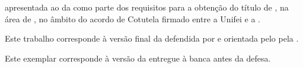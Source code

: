 \makeatletter
  \begin{center}
    \large\bfseries
    \@UNIFEI \\
    \@UNIDADEENSINO
  \end{center}
  \vfill
  \begin{center}
    \large\bfseries
    \if\@autora\relax\@autor\else\@autora\fi
  \vfill
    \@titulo
    \ifx\@subtitulo\relax\else
      \\[0.2cm]
      \normalfont
      \@subtitulo
    \fi
  \end{center}
  \vfill
  \normalfont\normalsize
  \hfill
  \begin{minipage}[t]{0.54\textwidth}
    \suppresshyphens
    \@monopt\xspace apresentada ao \@UNIDADEENSINO{} da \@UNIFEI{} como parte dos requisitos para a obtenção do título de \@degnamept\xspace \ifx\@areaConcentracao\relax\else, na área de \@areaConcentracao\fi \ifx\@cotutela\relax\else\xspace, no âmbito do acordo de Cotutela firmado entre a Unifei e a \@cotutela\fi.
  \end{minipage}
  \vfill
  \if\@orientadora{}
  \fi
  \ifnum{}
    \par\addvspace{1em}
    \if\@coorientadora{}
    \fi
  \fi
  \vfill
  \iffinalversion
    \begin{minipage}[t]{0.5\textwidth}
      \suppresshyphens
      Este trabalho corresponde à versão final da \@monopt\xspace defendida por
      \if\@autora\relax\@autor\else\@autora\fi\xspace e orientada
      \if\@orientadora\relax pelo \@orientador\else pela \@orientadora\fi.
    \end{minipage}
  \else
    \begin{minipage}[t]{0.5\textwidth}
      \suppresshyphens
      Este exemplar corresponde à versão da \@monopt\xspace entregue
      à banca antes da defesa.
    \end{minipage}
  \fi
  \vfill
  \begin{center}
    \large
    \@CIDADE\\ \@ano
  \end{center}
\makeatother